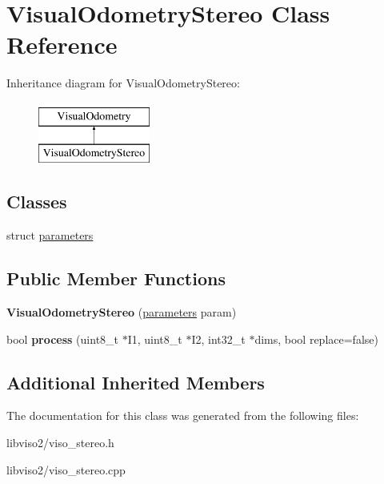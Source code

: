 \hypertarget{class_visual_odometry_stereo}{\section{Visual\+Odometry\+Stereo Class Reference}
\label{class_visual_odometry_stereo}
}
Inheritance diagram for Visual\+Odometry\+Stereo\+:\begin{figure}[H]
\begin{center}
\leavevmode
\includegraphics[height=2.000000cm]{class_visual_odometry_stereo}
\end{center}
\end{figure}
\subsection*{Classes}
\begin{DoxyCompactItemize}
\item 
struct \hyperlink{struct_visual_odometry_stereo_1_1parameters}{parameters}
\end{DoxyCompactItemize}
\subsection*{Public Member Functions}
\begin{DoxyCompactItemize}
\item 
\hypertarget{class_visual_odometry_stereo_ae77d23d33e9782c89d507a77f08df779}{{\bfseries Visual\+Odometry\+Stereo} (\hyperlink{struct_visual_odometry_stereo_1_1parameters}{parameters} param)}\label{class_visual_odometry_stereo_ae77d23d33e9782c89d507a77f08df779}

\item 
\hypertarget{class_visual_odometry_stereo_aa9832cd5fe9bc352418803f442c450a6}{bool {\bfseries process} (uint8\+\_\+t $\ast$I1, uint8\+\_\+t $\ast$I2, int32\+\_\+t $\ast$dims, bool replace=false)}\label{class_visual_odometry_stereo_aa9832cd5fe9bc352418803f442c450a6}

\end{DoxyCompactItemize}
\subsection*{Additional Inherited Members}


The documentation for this class was generated from the following files\+:\begin{DoxyCompactItemize}
\item 
libviso2/viso\+\_\+stereo.\+h\item 
libviso2/viso\+\_\+stereo.\+cpp\end{DoxyCompactItemize}

